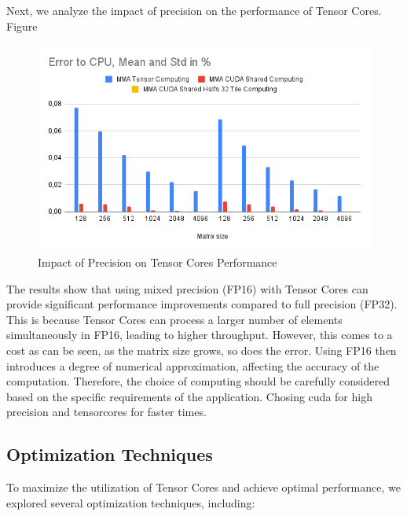 \documentclass[conference]{IEEEtran}
\begin{document}
  Next, we analyze the impact of precision on the performance of Tensor Cores. Figure %
  
  \begin{figure}[htbp]
    \centering
    \includegraphics[scale=0.38]{figures/Error to CPU.png}
    \caption{Impact of Precision on Tensor Cores Performance}
    \label{fig:precision-impact}
  \end{figure}
  
  The results show that using mixed precision (FP16) with Tensor Cores can provide significant performance improvements compared to full precision (FP32).
  This is because Tensor Cores can process a larger number of elements simultaneously in FP16,
  leading to higher throughput. However, this comes to a cost as can be seen, as the matrix size grows, so does the error.
  Using FP16 then introduces a degree of numerical approximation, affecting the accuracy of the computation.
  Therefore, the choice of computing should be carefully considered based on the specific
  requirements of the application. Chosing cuda for high precision and tensorcores for faster times.
  
  \subsection{Optimization Techniques}\label{sec:optimization-techniques}
  
  To maximize the utilization of Tensor Cores and achieve optimal performance, we explored several optimization techniques, including:
  
\end{document}
